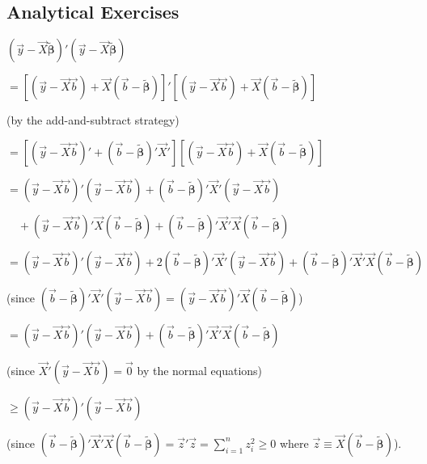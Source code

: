 
\begin{answers}

\subsection*{Analytical Exercises}

$(\vec{y} - \vec{X}\widetilde{\bm{\beta}})'
 (\vec{y} - \vec{X}\widetilde{\bm{\beta}})$

$= [(\vec{y} - \vec{X}\vec{b}) + \vec{X}(\vec{b} - \widetilde{\bm{\beta}})]'
   [(\vec{y} - \vec{X}\vec{b}) + \vec{X}(\vec{b} - \widetilde{\bm{\beta}})]$

\hspace{2em}(by the add-and-subtract strategy)

$= [(\vec{y} - \vec{X}\vec{b})' + (\vec{b} - \widetilde{\bm{\beta}})'\vec{X}']
   [(\vec{y} - \vec{X}\vec{b}) + \vec{X}(\vec{b} - \widetilde{\bm{\beta}})]$

$= (\vec{y} - \vec{X}\vec{b})'(\vec{y} - \vec{X}\vec{b})
 + (\vec{b} - \widetilde{\bm{\beta}})'\vec{X}'(\vec{y} - \vec{X}\vec{b})$

$\quad + (\vec{y} - \vec{X}\vec{b})'\vec{X}(\vec{b} - \widetilde{\bm{\beta}})
 + (\vec{b} - \widetilde{\bm{\beta}})'\vec{X}'\vec{X}
   (\vec{b} - \widetilde{\bm{\beta}})$

$= (\vec{y} - \vec{X}\vec{b})'(\vec{y} - \vec{X}\vec{b})
 + 2(\vec{b} - \widetilde{\bm{\beta}})'\vec{X}'(\vec{y} - \vec{X}\vec{b})
 + (\vec{b} - \widetilde{\bm{\beta}})'\vec{X}'\vec{X}
   (\vec{b} - \widetilde{\bm{\beta}})$

\hspace{2em}(since $(\vec{b} - \widetilde{\bm{\beta}})'\vec{X}'
(\vec{y} - \vec{X}\vec{b})
= (\vec{y} - \vec{X}\vec{b})'\vec{X}(\vec{b} - \widetilde{\bm{\beta}})$)

$= (\vec{y} - \vec{X}\vec{b})'(\vec{y} - \vec{X}\vec{b})
 + (\vec{b} - \widetilde{\bm{\beta}})'\vec{X}'\vec{X}
   (\vec{b} - \widetilde{\bm{\beta}})$

\hspace{2em}(since $\vec{X}'(\vec{y} - \vec{X}\vec{b}) = \vec{0}$
by the normal equations)

$\geq (\vec{y} - \vec{X}\vec{b})'(\vec{y} - \vec{X}\vec{b})$

\hspace{2em}(since $(\vec{b} - \widetilde{\bm{\beta}})'\vec{X}'\vec{X}
(\vec{b} - \widetilde{\bm{\beta}}) = \vec{z}'\vec{z}
= \sum_{i=1}^{n} z_i^2 \geq 0$ where
$\vec{z} \equiv \vec{X}(\vec{b} - \widetilde{\bm{\beta}})$).


\end{answers}
